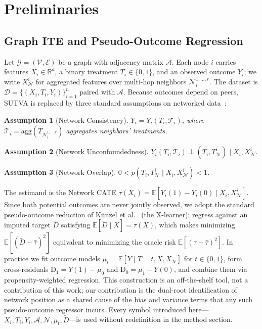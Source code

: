 \documentclass[sigconf,anonymous,review]{acmart}
\newtheorem{assumption}{Assumption}
\begin{document}
\section{Preliminaries}\label{sec:prelim}

\subsection{Graph ITE and Pseudo-Outcome Regression}

Let $\mathcal{G} = (\mathcal{V}, \mathcal{E})$ be a graph with adjacency matrix $\mathcal{A}$. Each node $i$ carries features $X_i \in \mathbb{R}^d$, a binary treatment $T_i \in \{0,1\}$, and an observed outcome $Y_i$; we write $X_{\mathcal{N}}^{i}$ for aggregated features over multi-hop neighbors $\mathcal{N}_i^{1,\ldots,r}$. The dataset is $\mathcal{D} = \{(X_i, T_i, Y_i)\}_{i=1}^{n}$ paired with $\mathcal{A}$. Because outcomes depend on peers, SUTVA is replaced by three standard assumptions on networked data~\cite{guo2020learning}:

\begin{assumption}[Network Consistency]
$Y_i = Y_i(T_i, \mathcal{T}_i)$, where $\mathcal{T}_i = \mathrm{agg}(T_{\mathcal{N}_i^{1,\ldots,r}})$ aggregates neighbors' treatments.
\end{assumption}

\begin{assumption}[Network Unconfoundedness]
$Y_i(T_i, \mathcal{T}_i) \perp (T_i, T_{\mathcal{N}}^{i}) \mid X_i, X_{\mathcal{N}}^{i}$.
\end{assumption}

\begin{assumption}[Network Overlap]
$0 < p(T_i,\! T_{\mathcal{N}}^{i} \mid X_i,\! X_{\mathcal{N}}^{i}) < 1$.
\end{assumption}

The estimand is the Network CATE $\tau(X_i) = \mathbb{E}[Y_i(1) - Y_i(0) \mid X_i, X_{\mathcal{N}}^{i}]$. Since both potential outcomes are never jointly observed, we adopt the standard pseudo-outcome reduction of Künzel et al.~\cite{kunzel2019metalearners} (the X-learner): regress against an imputed target $\tilde{D}$ satisfying $\mathbb{E}[\tilde{D} \mid X] = \tau(X)$, which makes minimizing $\mathbb{E}[(\tilde{D} - \hat{\tau})^2]$ equivalent to minimizing the oracle risk $\mathbb{E}[(\tau - \hat{\tau})^2]$. In practice we fit outcome models $\mu_t = \mathbb{E}[Y \mid T{=}t, X, X_{\mathcal{N}}]$ for $t \in \{0,1\}$, form cross-residuals $\mathrm{D}_1 = Y(1) - \mu_0$ and $\mathrm{D}_0 = \mu_1 - Y(0)$, and combine them via propensity-weighted regression. This construction is an off-the-shelf tool, not a contribution of this work; our contribution is the dual-root identification of network position as a shared cause of the bias and variance terms that any such pseudo-outcome regressor incurs. Every symbol introduced here---$X_i, T_i, Y_i, \mathcal{A}, \mathcal{N}, \mu_t, \tilde{D}$---is used without redefinition in the method section.
\end{document}
